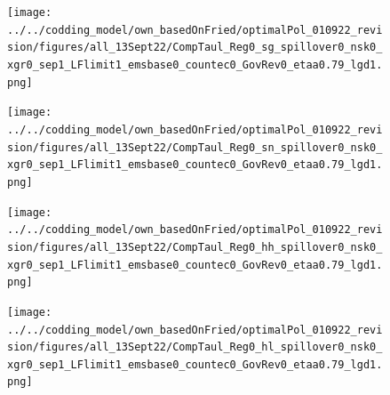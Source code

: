 \begin{figure}[h!!]
\begin{minipage}[]{0.32\textwidth}
\end{minipage}	
\begin{minipage}[]{0.32\textwidth}
\texttt{[image: ../../codding\_model/own\_basedOnFried/optimalPol\_010922\_revision/figures/all\_13Sept22/CompTaul\_Reg0\_sg\_spillover0\_nsk0\_xgr0\_sep1\_LFlimit1\_emsbase0\_countec0\_GovRev0\_etaa0.79\_lgd1.png]}
\end{minipage}
\begin{minipage}[]{0.32\textwidth}
\texttt{[image: ../../codding\_model/own\_basedOnFried/optimalPol\_010922\_revision/figures/all\_13Sept22/CompTaul\_Reg0\_sn\_spillover0\_nsk0\_xgr0\_sep1\_LFlimit1\_emsbase0\_countec0\_GovRev0\_etaa0.79\_lgd1.png]}
\end{minipage}	
\begin{minipage}[]{0.32\textwidth}
\texttt{[image: ../../codding\_model/own\_basedOnFried/optimalPol\_010922\_revision/figures/all\_13Sept22/CompTaul\_Reg0\_hh\_spillover0\_nsk0\_xgr0\_sep1\_LFlimit1\_emsbase0\_countec0\_GovRev0\_etaa0.79\_lgd1.png]}
\end{minipage}	
\begin{minipage}[]{0.32\textwidth}
\texttt{[image: ../../codding\_model/own\_basedOnFried/optimalPol\_010922\_revision/figures/all\_13Sept22/CompTaul\_Reg0\_hl\_spillover0\_nsk0\_xgr0\_sep1\_LFlimit1\_emsbase0\_countec0\_GovRev0\_etaa0.79\_lgd1.png]}
\end{minipage}
\end{figure}
